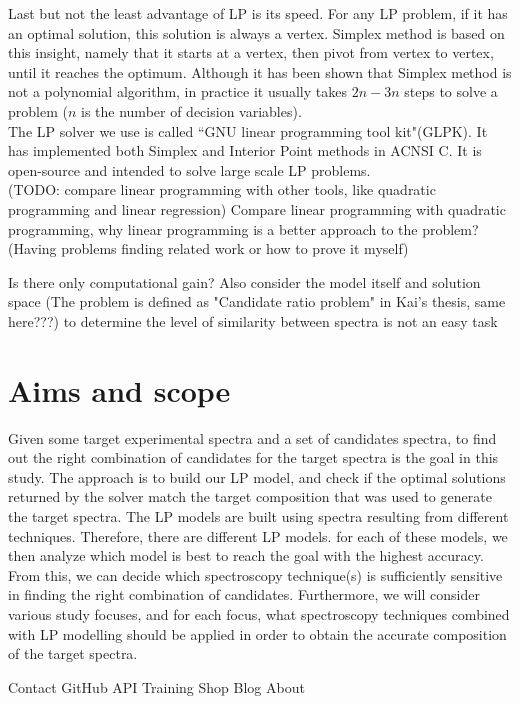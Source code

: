 Last but not the least advantage of LP is its speed. For any LP problem, if it has an optimal solution, this solution is always a vertex. Simplex method is based on this insight, namely that it starts at a vertex, then pivot from vertex to vertex, until it reaches the optimum. Although it has been shown that Simplex method is not a polynomial algorithm, in practice it usually takes $2n-3n$ steps to solve a problem ($n$ is the number of decision variables). \\

The LP solver we use is called ``GNU linear programming tool kit"(GLPK). It has implemented both Simplex and Interior Point methods in ACNSI C. It is open-source and intended to solve large scale LP problems. \\


(TODO: compare linear programming with other tools, like quadratic programming and linear regression)
Compare linear programming with quadratic programming, why linear programming is a better approach to the problem? (Having problems finding related work or how to prove it myself)
	
Is there only computational gain?
Also consider the model itself and solution space	
(The problem is defined as "Candidate ratio problem" in Kai's thesis, same here???)
to determine the level of similarity between spectra is not an easy task 
	
\section{Aims and scope}
Given some target experimental spectra and a set of candidates spectra, to find out the right combination of candidates for the target spectra is the goal in this study. The approach is to build our LP model, and check if the optimal solutions returned by the solver match the target composition that was used to generate the target spectra. The LP models are built using spectra resulting from different techniques. Therefore, there are different LP models. for each of these models, we then analyze which model is best to reach the goal with the highest accuracy. From this, we can decide which spectroscopy technique(s) is sufficiently sensitive in finding the right combination of candidates. Furthermore, we will consider various study focuses, and for each focus, what spectroscopy techniques combined with LP modelling should be applied in order to obtain the accurate composition of the target spectra. 

    Contact GitHub API Training Shop Blog About 

